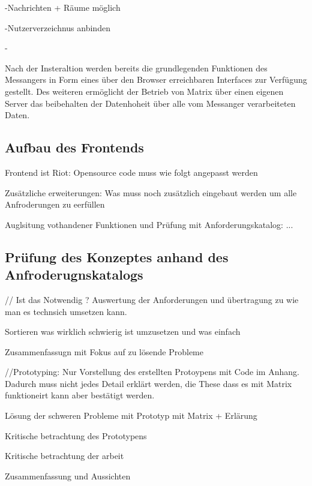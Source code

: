 -Nachrichten + Räume möglich 

-Nutzerverzeichnus anbinden 

-

Nach der Insteraltion werden bereits die grundlegenden Funktionen des Messangers in Form eines über den Browser erreichbaren Interfaces zur Verfügung gestellt. Des weiteren ermöglicht der Betrieb von Matrix über einen eigenen Server das beibehalten der Datenhoheit über alle vom Messanger verarbeiteten Daten. 

\subsection{Aufbau des Frontends}\label{chapter:vdmf}
Frontend ist Riot: Opensource code muss wie folgt angepasst werden

Zusätzliche erweiterungen:
Was muss noch zusätzlich eingebaut werden um alle Anfroderungen zu eerfüllen 

Auglsitung vothandener Funktionen und Prüfung mit Anforderungskatalog:
...

\subsection{Prüfung des Konzeptes anhand des Anfroderugnskatalogs}\label{chapter:vdmf}
// Ist das Notwendig ?
Auswertung der Anforderungen und übertragung zu wie man es technsich umsetzen kann.

Sortieren was wirklich schwierig ist umzusetzen und was einfach

Zusammenfassugn mit Fokus auf zu lösende Probleme

//Prototyping: Nur Vorstellung des erstellten Protoypens mit Code im Anhang. Dadurch muss nicht jedes Detail erklärt werden, die These dass es mit Matrix funktioneirt kann aber bestätigt werden.

Lösung der schweren Probleme mit Prototyp mit Matrix + Erlärung 

Kritische betrachtung des Prototypens 

Kritische betrachtung der arbeit

Zusammenfassung und Aussichten

